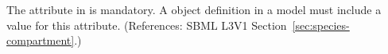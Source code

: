 The  attribute in \Species is mandatory.  A \Species
object definition in a model must include a value for this attribute.
(References: SBML L3V1 Section~\ref{sec:species-compartment}.)

